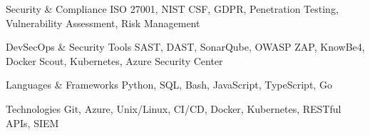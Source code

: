 
\begin{cventries}

  \cventry
    {Security \& Compliance} %
    {ISO 27001, NIST CSF, GDPR, Penetration Testing, Vulnerability Assessment, Risk Management} %
    {} %
    {} %
    {
      \begin{cvitems}
      \end{cvitems}
    }

  \cventry
    {DevSecOps \& Security Tools} %
    {SAST, DAST, SonarQube, OWASP ZAP, KnowBe4, Docker Scout, Kubernetes, Azure Security Center} %
    {} %
    {} %
    {
      \begin{cvitems}
      \end{cvitems}
    }

  \cventry
    {Languages \& Frameworks} %
    {Python, SQL, Bash, JavaScript, TypeScript, Go} %
    {} %
    {} %
    {
      \begin{cvitems}
      \end{cvitems}
    }

  \cventry
    {Technologies} %
    {Git, Azure, Unix/Linux, CI/CD, Docker, Kubernetes, RESTful APIs, SIEM} %
    {} %
    {} %
    {
      \begin{cvitems}
      \end{cvitems}
    }

\end{cventries}
